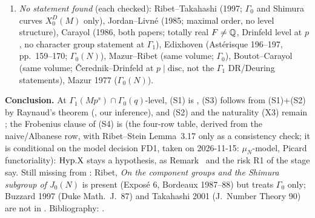 \begin{remark}
\begin{enumerate}[label=(\alph*)]
  compatibility at $q$ (row 2, \stpmc, our inference), with rows 3, 1, 4 following by the change of functoriality and the model comparison (\stpmc). Diamond--Im (8.4.1)
  exhibits the diamond $\langle p\rangle$ in the gluing of the naive model. Naturality in $s$ (X3) is stated nowhere.
\item \emph{No statement found} (each checked): Ribet--Takahashi (1997; $\Gamma_0$ and Shimura curves $X_0^D(M)$ only), Jordan--Livné
  (1985; maximal order, no level structure), Carayol (1986, both papers; totally real $F\ne\mathbb{Q}$, Drinfeld level at $p$, no character
  group statement at $\Gamma_1$), Edixhoven (Astérisque 196--197, pp.~159--170; $\Gamma_0(N)$), Mazur--Ribet (same volume;
  $\Gamma_0$), Boutot--Carayol (same volume; Čerednik--Drinfeld at $p\mid\mathrm{disc}$, not the $\Gamma_1$ DR/Deuring
  statements), Mazur 1977 ($\Gamma_0(N)$).
\end{enumerate}
\textbf{Conclusion.} At $\Gamma_1(Mp^s)\cap\Gamma_0(q)$-level, (S1) is \stcited{}, (S3) follows from (S1)+(S2) by Raynaud's theorem
(\stpmc, our inference), and (S2) and the naturality (X3) remain \stexp{}; the Frobenius clause of (S4) is \stpmc{} (the four-row table, derived from the naive/Albanese row, with Ribet--Stein Lemma~3.17 only as a consistency check; it is conditional on the model decision FD1, taken on 2026-11-15: $\mu_N$-model, Picard functoriality): $\mathrm{Hyp.X}$ stays a
hypothesis, as Remark~ and the risk R1 of the stage say. Still missing from : Ribet,
\emph{On the component groups and the Shimura subgroup of $J_0(N)$} is present (Exposé 6, Bordeaux 1987--88) but treats
$\Gamma_0$ only; Buzzard 1997 (Duke Math.\ J.\ 87) and Takahashi 2001 (J.\ Number Theory 90) are not in . Bibliography: \cite{DR,DI95,Hel,RS,Ri90,Mz,Ast196}.
\end{remark}
